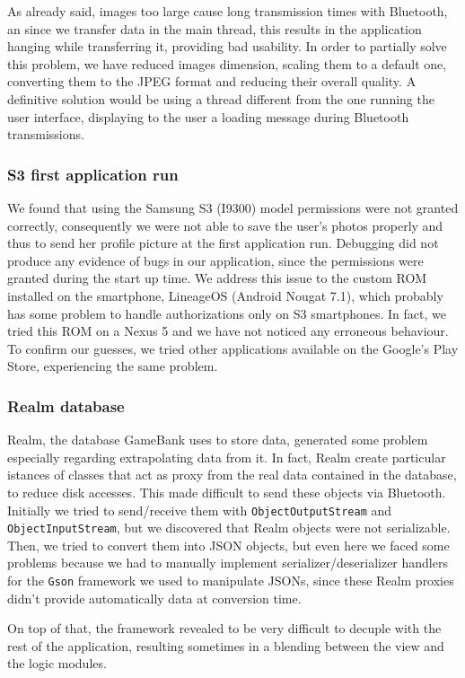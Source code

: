 As already said, images too large cause long transmission times with Bluetooth, 
an since we transfer data  in the main thread, this results in the application 
hanging while transferring it, providing bad usability. In order to partially 
solve this problem, we have reduced images dimension, scaling them to a default 
one, converting them to the JPEG format and reducing their overall quality. A 
definitive solution would be using a thread different from the one running the 
user interface, displaying to the user a loading message during Bluetooth 
transmissions.

\subsubsection{S3 first application run}

We found that using the Samsung S3 (I9300) model permissions were not granted 
correctly, consequently we were not able to save the user's photos properly and 
thus to send her profile picture at the first application run. Debugging did 
not produce any evidence of bugs in our application, since the permissions 
were granted during the start up time.
We address this issue to the custom ROM installed on the smartphone, LineageOS 
(Android Nougat 7.1), which probably has some problem to handle authorizations 
only on S3 smartphones. In fact, we tried this ROM on a Nexus 5 and we have not 
noticed any erroneous behaviour. To confirm our guesses, we tried other 
applications available on the Google's Play Store, experiencing the same 
problem.

\subsubsection{Realm database}

Realm, the database GameBank uses to store data, generated some problem 
especially regarding extrapolating data from it. In fact, Realm create 
particular istances of classes that act as proxy from the real data contained 
in the database, to reduce disk accesses. This made difficult to send these objects 
via Bluetooth. Initially we tried to send/receive them with 
\texttt{ObjectOutputStream} and \texttt{ObjectInputStream}, but we discovered 
that Realm objects were not serializable. Then, we tried to convert them into 
JSON objects, but even here we faced some problems because we had to manually 
implement serializer/deserializer handlers for the \texttt{Gson} framework we 
used to manipulate JSONs, since these Realm proxies didn't provide 
automatically data at conversion time.

On top of that, the framework revealed to be very difficult to decuple with the 
rest of the application, resulting sometimes in a blending between the view and 
the logic modules.
